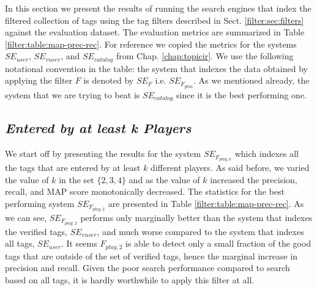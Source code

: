 In this section we present the results of running the search engines that index the filtered collection of tags using the tag filters described in Sect. \ref{filter:sec:filters} against the evaluation dataset. The evaluation metrics are summarized in Table \ref{filter:table:map-prec-rec}. For reference we copied the metrics for the systems $SE_{user}$, $SE_{vuser}$, and $SE_{catalog}$ from Chap. \ref{chap:topicir}. We use the following notational convention in the table: the system that indexes the data obtained by applying the filter $F$ is denoted by $SE_F$ i.e. $SE_{F_{gtaa}}$. As we mentioned already, the system that we are trying to beat is $SE_{catalog}$ since it is the best performing one. %


\subsection{\textit{Entered by at least \textbf{k} Players}}
We start off by presenting the results for the system $SE_{F_{play,k}}$ which indexes all the tags that are entered by at least $k$ different players. As said before, we varied the value of $k$ in the set $\{2,3,4\}$ and as the value of $k$ increased the precision, recall, and MAP score monotonically decreased. The statistics for the best performing system $SE_{F_{play,2}}$ are presented in Table \ref{filter:table:map-prec-rec}. As we can see, $SE_{F_{play,2}}$ performs only marginally better than the system that indexes the verified tags,  $SE_{vuser}$, and much worse compared to the system that indexes all tags, $SE_{user}$. It seems $F_{play,2}$ is able to detect only a small fraction of the good tags that are outside of the set of verified tags, hence the marginal increase in precision and recall. Given the poor search performance compared to search based on all tags, it is hardly worthwhile to apply this filter at all.

